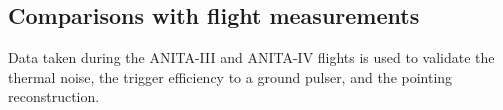 %
%
%
%



\subsection{Comparisons with flight measurements}
\label{subsec:validation_flight}
Data taken during the ANITA-III and ANITA-IV flights is used to validate 
the thermal noise, the trigger efficiency to a ground pulser, and the pointing reconstruction.


